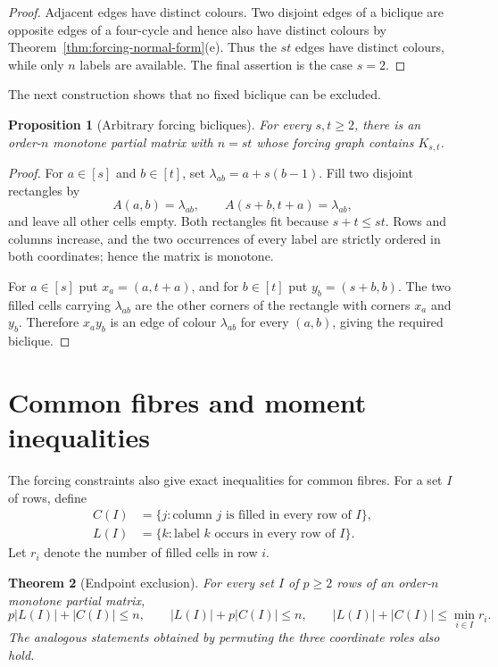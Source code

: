\documentclass[11pt]{article}
\numberwithin{equation}{section}
\newtheorem{theorem}{Theorem}[section]
\newtheorem{proposition}[theorem]{Proposition}
\theoremstyle{definition}
\theoremstyle{remark}
\begin{document}
\begin{proof}
Adjacent edges have distinct colours.  Two disjoint edges of a biclique are
opposite edges of a four-cycle and hence also have distinct colours by
Theorem~\ref{thm:forcing-normal-form}(e).  Thus the $st$ edges have distinct
colours, while only $n$ labels are available.  The final assertion is the case
$s=2$.
\end{proof}

The next construction shows that no fixed biclique can be excluded.

\begin{proposition}[Arbitrary forcing bicliques]\label{prop:arbitrary-bicliques}
For every $s,t\ge2$, there is an order-$n$ monotone partial matrix with
$n=st$ whose forcing graph contains $K_{s,t}$.
\end{proposition}

\begin{proof}
For $a\in[s]$ and $b\in[t]$, set $\lambda_{ab}=a+s(b-1)$.  Fill two disjoint
rectangles by
\[
 A(a,b)=\lambda_{ab},\qquad
 A(s+b,t+a)=\lambda_{ab},
\]
and leave all other cells empty.  Both rectangles fit because $s+t\le st$.
Rows and columns increase, and the two occurrences of every label are strictly
ordered in both coordinates; hence the matrix is monotone.

For $a\in[s]$ put $x_a=(a,t+a)$, and for $b\in[t]$ put
$y_b=(s+b,b)$.  The two filled cells carrying $\lambda_{ab}$ are the other
corners of the rectangle with corners $x_a$ and $y_b$.  Therefore $x_ay_b$ is
an edge of colour $\lambda_{ab}$ for every $(a,b)$, giving the required
biclique.
\end{proof}

\section{Common fibres and moment inequalities}
\label{sec:common-fibres}

The forcing constraints also give exact inequalities for common fibres.  For
a set $I$ of rows, define
\begin{align*}
 C(I)&=\{j:\text{column }j\text{ is filled in every row of }I\},\\
 L(I)&=\{k:\text{label }k\text{ occurs in every row of }I\}.
\end{align*}
Let $r_i$ denote the number of filled cells in row $i$.

\begin{theorem}[Endpoint exclusion]\label{thm:endpoint-exclusion}
For every set $I$ of $p\ge2$ rows of an order-$n$ monotone partial matrix,
\begin{equation}\label{eq:endpoint-exclusion}
 p|L(I)|+|C(I)|\le n,\qquad
 |L(I)|+p|C(I)|\le n,\qquad
 |L(I)|+|C(I)|\le\min_{i\in I}r_i.
\end{equation}
The analogous statements obtained by permuting the three coordinate roles
also hold.
\end{theorem}
\end{document}
